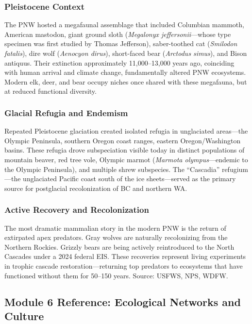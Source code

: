\documentclass[11pt,letterpaper]{article}
\begin{document}
\subsubsection{Pleistocene Context}
The PNW hosted a megafaunal assemblage that included Columbian mammoth, American mastodon, giant ground sloth (\textit{Megalonyx jeffersonii}---whose type specimen was first studied by Thomas Jefferson), saber-toothed cat (\textit{Smilodon fatalis}), dire wolf (\textit{Aenocyon dirus}), short-faced bear (\textit{Arctodus simus}), and Bison antiquus. Their extinction approximately 11,000--13,000 years ago, coinciding with human arrival and climate change, fundamentally altered PNW ecosystems. Modern elk, deer, and bear occupy niches once shared with these megafauna, but at reduced functional diversity.

\subsubsection{Glacial Refugia and Endemism}
Repeated Pleistocene glaciation created isolated refugia in unglaciated areas---the Olympic Peninsula, southern Oregon coast ranges, eastern Oregon/Washington basins. These refugia drove subspeciation visible today in distinct populations of mountain beaver, red tree vole, Olympic marmot (\textit{Marmota olympus}---endemic to the Olympic Peninsula), and multiple shrew subspecies. The ``Cascadia'' refugium---the unglaciated Pacific coast south of the ice sheets---served as the primary source for postglacial recolonization of BC and northern WA.

\subsubsection{Active Recovery and Recolonization}
The most dramatic mammalian story in the modern PNW is the return of extirpated apex predators. Gray wolves are naturally recolonizing from the Northern Rockies. Grizzly bears are being actively reintroduced to the North Cascades under a 2024 federal EIS. These recoveries represent living experiments in trophic cascade restoration---returning top predators to ecosystems that have functioned without them for 50--150 years. Source: USFWS, NPS, WDFW.

\subsection{Module 6 Reference: Ecological Networks and Culture}
\end{document}
